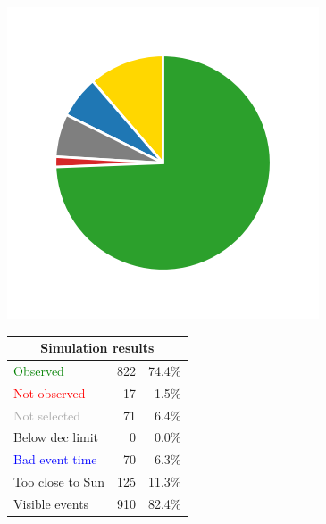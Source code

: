 \begin{colsection}
\begin{colsection}
\begin{figure}[p]
\begin{center}
    \begin{minipage}[t]{0.2\textwidth}\vspace{10pt}
    \includegraphics[width=\linewidth]{images/gw_sims/2n8&1s4_pie.png}
    \end{minipage}
    \begin{minipage}[t]{0.37\textwidth}\vspace{0pt}
    \begin{tabular}{lrr}
    \multicolumn{3}{c}{\textbf{Simulation results}} \\
    \midrule
    \textcolor{Green}{Observed} & 822 & 74.4\% \\
    \textcolor{Red}{Not observed} & 17 & 1.5\% \\
    \textcolor{darkgray}{Not selected} & 71 & 6.4\% \\
    \textcolor{NavyBlue}{Below dec limit} & 0 & 0.0\% \\
    \textcolor{Blue}{Bad event time} & 70 & 6.3\% \\
    \textcolor{BurntOrange}{Too close to Sun} & 125 & 11.3\% \\
    \midrule
    Visible events & 910 &  82.4\% \\
    \end{tabular}
    \end{minipage}

\end{center}
\end{figure}
\end{colsection}
\end{colsection}
